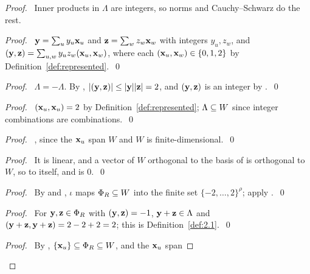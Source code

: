 \begin{proof}
 \pfsketch\ Inner products in $\Lambda$ are integers, so norms and Cauchy--Schwarz do the rest.
 \begin{proof}\pf\ ${\mathbf y}=\sum_u y_u{\mathbf x}_u$ and ${\mathbf z}=\sum_w z_w{\mathbf x}_w$ with integers $y_u,z_w$, and
  $({\mathbf y},{\mathbf z})=\sum_{u,w}y_uz_w({\mathbf x}_u,{\mathbf x}_w)$, where each $({\mathbf x}_u,{\mathbf x}_w)\in\{0,1,2\}$ by
  Definition~\ref{def:represented}.~\qed\end{proof}
 \begin{proof}\pf\ $\Lambda=-\Lambda$. By ,
  $|({\mathbf y},{\mathbf z})|\le|{\mathbf y}||{\mathbf z}|=2$, and $({\mathbf y},{\mathbf z})$ is an integer by
  .~\qed\end{proof}
 \begin{proof}\pf\ $({\mathbf x}_u,{\mathbf x}_u)=2$ by Definition~\ref{def:represented}; $\Lambda\subseteq W$ since integer
  combinations are combinations.~\qed\end{proof}
 \begin{proof}\pf\ , since the ${\mathbf x}_u$ span $W$ and $W$ is
  finite-dimensional.~\qed\end{proof}
 \begin{proof}\pf\ It is linear, and a vector of $W$ orthogonal to the basis of
   is orthogonal to $W$, so to itself, and is 0.~\qed\end{proof}
 \begin{proof}\pf\ By  and , $\iota$ maps $\Phi_R\subseteq W$
  into the finite set $\{-2,\dots,2\}^\rho$; apply .~\qed\end{proof}
 \begin{proof}\pf\ For ${\mathbf y},{\mathbf z}\in\Phi_R$ with $({\mathbf y},{\mathbf z})=-1$, ${\mathbf y}+{\mathbf z}\in \Lambda$ and
  $({\mathbf y}+{\mathbf z},{\mathbf y}+{\mathbf z})=2-2+2=2$; this is Definition~\ref{def:2.1}.~\qed\end{proof}
 \begin{proof}\pf\ By , $\{{\mathbf x}_u\}\subseteq\Phi_R\subseteq W$, and the ${\mathbf x}_u$ span

\end{proof}
\end{proof}
